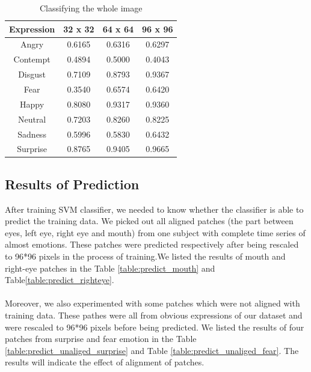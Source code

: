 \begin{table}
\caption{Classifying the whole image}
\label{table:entire_images}

\begin{tabular}{| c | c | c | c |}
\hline
Expression & 32 x 32 &  64 x 64  & 96 x 96  \\

\hline
Angry	 & 0.6165 & 0.6316 & 0.6297	\\
Contempt & 0.4894 & 0.5000 & 0.4043	\\
Disgust	 & 0.7109 & 0.8793 & 0.9367	\\
Fear	 & 0.3540 & 0.6574 & 0.6420	\\
Happy	 & 0.8080 & 0.9317 & 0.9360	\\
Neutral	 & 0.7203 & 0.8260 & 0.8225	\\
Sadness	 & 0.5996 & 0.5830 & 0.6432	\\
Surprise & 0.8765 & 0.9405 & 0.9665	\\

\hline
\end{tabular}
\end{table}


\subsection{Results of Prediction}
After training SVM classifier, we needed to know whether the classifier is able to predict the training data. We picked out all aligned patches (the part between eyes, left eye, right eye and mouth) from one subject with complete time series of almost emotions. These patches were predicted respectively after being rescaled to 96*96 pixels in the process of training.We listed the results of mouth and right-eye patches in the Table \ref{table:predict_mouth} and Table\ref{table:predict_righteye}.
\\
\\
Moreover, we also experimented with some patches which were not aligned with training data. These pathes were all from obvious expressions of our dataset and were rescaled to 96*96 pixels before being predicted. We listed the results of four patches from surprise and fear emotion in the Table \ref{table:predict_unaliged_surprise} and Table \ref{table:predict_unaliged_fear}. The results will indicate the effect of alignment of patches.

